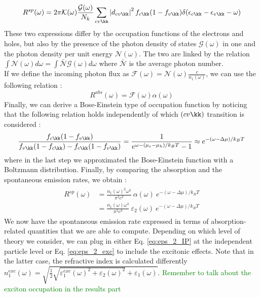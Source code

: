 \begin{equation}
	R^{sp}(\omega) = 2\pi \mathcal{K}(\omega) \frac{\mathcal{G} (\omega)}{N_k} \sum_{cv\kk} \left|d_{cv\kk} \right|^2 f_{c\kk}(1-f_{v\kk}) \delta(\epsilon_{c\kk} - \epsilon_{v\kk} - \omega)
\end{equation}
These two expressions differ by the occupation functions of the electrons and holes, but also by the presence of the photon density of states $\mathcal{G}(\omega)$ in one and the photon density per unit energy $\mathcal{N}(\omega)$. The two are linked by the relation $ \int\mathcal{N}(\omega) d\omega = \int \bar{\mathcal{N}} \mathcal{G}(\omega) d\omega$ where $\bar{\mathcal{N}}$ is the average photon number. \\
If we define the incoming photon flux as $\mathcal{F}(\omega) = \mathcal{N}(\omega) \frac{c}{n_1(\omega)}$, we can use the following relation :
\begin{equation}
	R^{abs}(\omega) = \mathcal{F}(\omega) \alpha(\omega)
\end{equation}
Finally, we can derive a Bose-Einstein type of occupation function by noticing that the following relation holds independently of which $(cv\kk)$ transition is considered :
\begin{equation}
	\frac{f_{c\kk} (1-f_{v\kk})}{f_{v\kk} (1-f_{c\kk}) - f_{c\kk}(1-f_{v\kk})} = \frac{1}{e^{\omega - (\mu_e - \mu_h)/k_BT} - 1 }\approx e^{-(\omega - \Delta \mu)/k_BT}
\end{equation}
where in the last step we approximated the Bose-Einstein function with a Boltzmann distribution.
Finally, by comparing the absorption and the spontaneous emission rates, we obtain :
\begin{align}
\begin{split}
	R^{sp}(\omega) &= \frac{n_1(\omega)^2\omega^2}{\pi^2 c^2}\ \alpha(\omega)\ e^{-(\omega - \Delta \mu)/k_BT} \\
	 &= \frac{n_1(\omega)\omega^3}{\pi^2 c^3}\ \varepsilon_2(\omega)\ e^{-(\omega - \Delta \mu)/k_BT} \label{eq:vRS_PL}
\end{split}
\end{align}
We now have the spontaneous emission rate expressed in terms of absorption-related quantities that we are able to compute. Depending on which level of theory we consider, we can plug in either Eq. \eqref{eq:eps_2_IP} at the independent particle level or Eq. \eqref{eq:eps_2_exc} to include the excitonic effects. Note that in the latter case, the refractive index is calculated differently $n_1^{exc}(\omega) = \sqrt{\tfrac{1}{2}\sqrt{\varepsilon_1^{exc}(\omega)^2+\varepsilon_2(\omega)^2} + \varepsilon_1(\omega)}$.
\textcolor{green}{Remember to talk about the exciton occupation in the results part}


